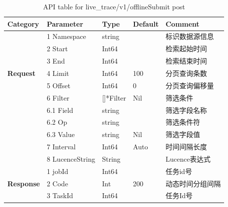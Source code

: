\begin{table}[htbp]  
\centering  
\caption{API table for live\_trace/v1/offlineSubmit post} 
{
\begin{tabular}{p{2cm}p{3cm}p{2cm}p{2cm}p{4cm}}  
\toprule  
\textbf{Category} & \textbf{Parameter} & \textbf{Type} & \textbf{Default} & \textbf{Comment} \\ \midrule  
\multirow{7}{*}{\textbf{Request}} & {1} Namespace & string & & 标识数据源信息 \\  
& {2} Start & Int64 & & 检索起始时间 \\  
& {3} End & Int64 & & 检索结束时间 \\  
& {4} Limit & Int64 & 100 & 分页查询条数 \\  
& {5} Offset & Int64 & 0 & 分页查询偏移量 \\  
& {6} Filter & []*Filter & Nil & 筛选条件 \\  
& {  6.1} Field & string & & 筛选字段名称 \\  
& {  6.2} Op & string & & 筛选条件符 \\  
& {  6.3} Value & string & Nil & 筛选字段值 \\  
& {7} Interval & Int64 & Auto & 时间间隔长度 \\  
& {8} LucenceString & String & & Lucence表达式 \\ \cmidrule{2-5}  
\multirow{3}{*}{\textbf{Response}} & {1} jobId & Int64 & & 任务id号\\ &{2} Code & Int & 200 & 动态时间分组间隔 \\  
&{3} TaskId & Int64 & & 任务Id号 \\  
\bottomrule  
\end{tabular}  
\label{table:offlineSubmit}
}
\end{table}  

